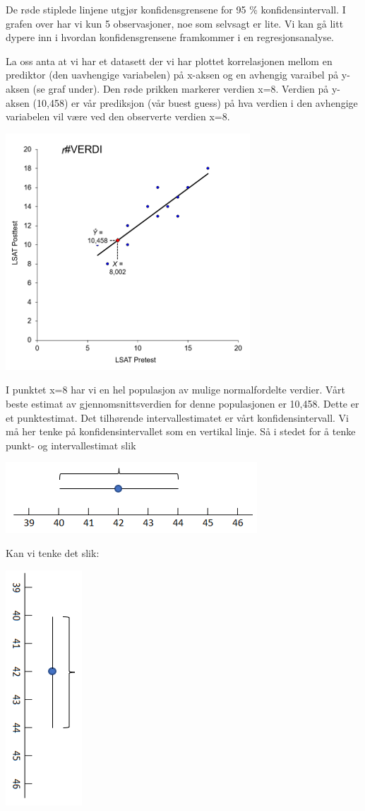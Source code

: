 \documentclass[
]{article}
\begin{document}
De røde stiplede linjene utgjør konfidensgrensene for 95 \%
konfidensintervall. I grafen over har vi kun 5 observasjoner, noe som
selvsagt er lite. Vi kan gå litt dypere inn i hvordan konfidensgrensene
framkommer i en regresjonsanalyse.

La oss anta at vi har et datasett der vi har plottet korrelasjonen
mellom en prediktor (den uavhengige variabelen) på x-aksen og en
avhengig varaibel på y-aksen (se graf under). Den røde prikken markerer
verdien x=8. Verdien på y-aksen (10,458) er vår prediksjon (vår buest
guess) på hva verdien i den avhengige variabelen vil være ved den
observerte verdien x=8.

\includegraphics{Teori_fig6.png}

I punktet x=8 har vi en hel populasjon av mulige normalfordelte verdier.
Vårt beste estimat av gjennomsnittsverdien for denne populasjonen er
10,458. Dette er et punktestimat. Det tilhørende intervallestimatet er
vårt konfidensintervall. Vi må her tenke på konfidensintervallet som en
vertikal linje. Så i stedet for å tenke punkt- og intervallestimat slik

\includegraphics{Teori_fig7.png}

Kan vi tenke det slik:

\includegraphics{Teori_fig8.png}
\end{document}
